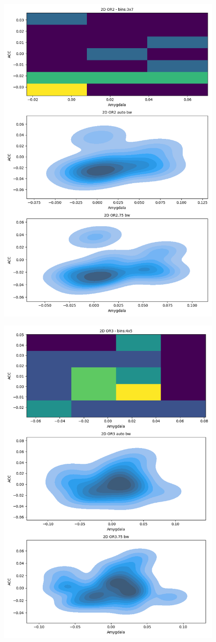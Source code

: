 \documentclass[twoside,12pt]{article}
\begin{document}
\begin{enumerate}[label*=\arabic*.]
  \begin{figure}[H]
        \centering
        \includegraphics[width=\textwidth, height=\textwidth]{images/2D_2D OR2.png}
    \end{figure}
  \begin{figure}[H]
        \centering
        \includegraphics[width=\textwidth, height=\textwidth]{images/2D_2D OR3.png}

\end{figure}
\end{enumerate}
\end{document}
